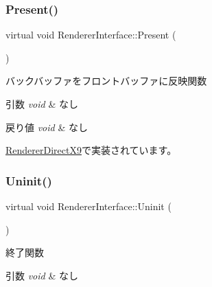 \mbox{\label{class_renderer_interface_aa9e12d2a2f5ffa351c457cfc7806b6f1}} 
\subsubsection{\texorpdfstring{Present()}{Present()}}
{\footnotesize\ttfamily virtual void Renderer\+Interface\+::\+Present (\begin{DoxyParamCaption}{ }\end{DoxyParamCaption})\hspace{0.3cm}{\ttfamily [pure virtual]}}



バックバッファをフロントバッファに反映関数 


\begin{DoxyParams}{引数}
{\em void} & なし \\
\hline
\end{DoxyParams}

\begin{DoxyRetVals}{戻り値}
{\em void} & なし \\
\hline
\end{DoxyRetVals}


\mbox{\hyperlink{class_renderer_direct_x9_a77dbc76e8adbe4f9ee41c5f09e5ebe81}{Renderer\+Direct\+X9}}で実装されています。

\mbox{\label{class_renderer_interface_ada105489f9db98e7e9542b278699d558}} 
\subsubsection{\texorpdfstring{Uninit()}{Uninit()}}
{\footnotesize\ttfamily virtual void Renderer\+Interface\+::\+Uninit (\begin{DoxyParamCaption}{ }\end{DoxyParamCaption})\hspace{0.3cm}{\ttfamily [pure virtual]}}



終了関数 


\begin{DoxyParams}{引数}
{\em void} & なし \\
\hline
\end{DoxyParams}

